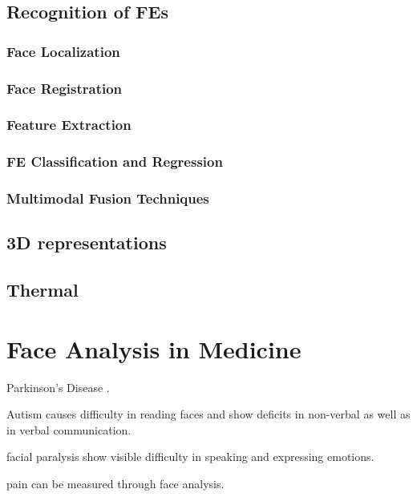 \subsection{Recognition of FEs}

\subsubsection{Face Localization}

\subsubsection{Face Registration}

\subsubsection{Feature Extraction}

\subsubsection{FE Classification and Regression}

\subsubsection{Multimodal Fusion Techniques}

\subsection{3D representations}
\cite{Sandbach2012survey}
\subsection{Thermal}

\section{Face Analysis in Medicine}

Parkinson's Disease \cite{Almutiry2016}.

Autism causes difficulty in reading faces and show deficits in non-verbal as well as in verbal communication.

facial paralysis show visible difficulty in speaking and expressing emotions.

pain can be measured through face analysis.

